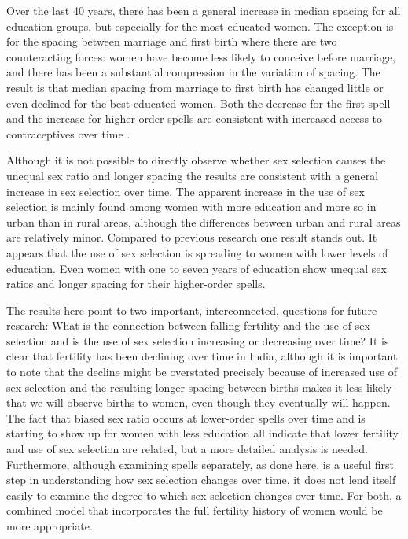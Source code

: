 \documentclass[12pt,letterpaper]{article}
\begin{document}
Over the last 40 years, there has been a general increase in median
spacing for all education groups, but especially for the most 
educated women.
The exception is for the spacing between marriage and first birth
where there are two counteracting forces: women have become less likely 
to conceive before marriage, and there has been a substantial compression 
in the variation of spacing.
The result is that median spacing from marriage to first birth
has changed little or even declined for the best-educated women.
Both the decrease for the first spell and the increase for higher-order
spells are consistent with increased access to contraceptives over
time \citep{Yeakey2009}.



Although it is not possible to directly observe whether sex selection
causes the unequal sex ratio and longer spacing the results are
consistent with a general increase in sex selection over time. 
The apparent increase in the use of sex selection is mainly found among
women with more education and more so in urban than in rural areas,
although the differences between urban and rural areas are relatively
minor. 
Compared to previous research one result stands out. 
It appears that the use of sex selection is spreading to women with lower 
levels of education.
Even women with one to seven years of education show unequal sex ratios 
and longer spacing for their higher-order spells.

The results here point to two important, interconnected, questions 
for future research:
What is the connection between falling fertility and the 
use of sex selection and is the use of sex selection increasing 
or decreasing over time?
It is clear that fertility has been declining over time in India,
although it is important to note that the decline might be
overstated precisely because of increased use of sex selection and
the resulting longer spacing between births makes it less likely 
that we will observe births to women, even though they eventually
will happen.
The fact that biased sex ratio occurs at lower-order spells over
time and is starting to show up for women with less education 
all indicate that lower fertility and use of sex selection are
related, but a more detailed analysis is needed.
Furthermore, although examining spells separately, as done here, is a useful
first step in understanding how sex selection changes over time,
it does not lend itself easily to examine the degree to which
sex selection changes over time.
For both, a combined model that incorporates the full fertility
history of women would be more appropriate.
\end{document}
